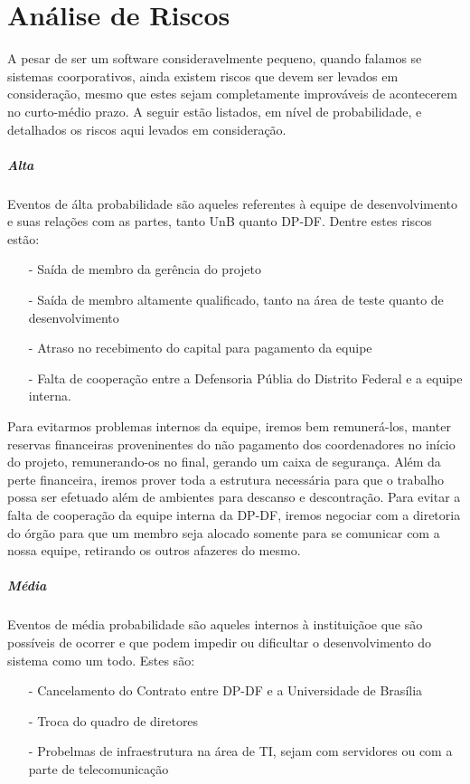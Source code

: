 \documentclass[12pt,a4paper]{report}
\begin{document}
\chapter{Análise de Riscos}

A pesar de ser um software consideravelmente pequeno, quando falamos se sistemas coorporativos, ainda existem riscos que devem ser levados em consideração, mesmo que estes sejam completamente improváveis de acontecerem no curto-médio prazo. A seguir estão listados, em nível de probabilidade, e detalhados os riscos aqui levados em consideração.

\paragraph{Alta} Eventos de álta probabilidade são aqueles referentes à equipe de desenvolvimento e suas relações com as partes, tanto UnB quanto DP-DF. Dentre estes riscos estão:

\begin{itemize}
\item [-] Saída de membro da gerência do projeto
\item [-] Saída de membro altamente qualificado, tanto na área de teste quanto de desenvolvimento
\item [-] Atraso no recebimento do capital para pagamento da equipe
\item [-] Falta de cooperação entre a Defensoria Públia do Distrito Federal e a equipe interna.
\end{itemize}

Para evitarmos problemas internos da equipe, iremos bem remunerá-los, manter reservas financeiras proveninentes do não pagamento dos coordenadores no início do projeto, remunerando-os no final, gerando um caixa de segurança. Além da perte financeira, iremos prover toda a estrutura necessária para que o trabalho possa ser efetuado além de ambientes para descanso e descontração. Para evitar a falta de cooperação da equipe interna da DP-DF, iremos negociar com a diretoria do órgão para que um membro seja alocado somente para se comunicar com a nossa equipe, retirando os outros afazeres do mesmo.

\paragraph{Média} Eventos de média probabilidade são aqueles internos à instituiçãoe que são possíveis de ocorrer e que podem impedir ou dificultar o desenvolvimento do sistema como um todo. Estes são:
\begin{itemize}
\item [-] Cancelamento do Contrato entre DP-DF e a Universidade de Brasília
\item [-] Troca do quadro de diretores
\item [-] Probelmas de infraestrutura na área de TI, sejam com servidores ou com a parte de telecomunicação
\end{itemize}
\end{document}
